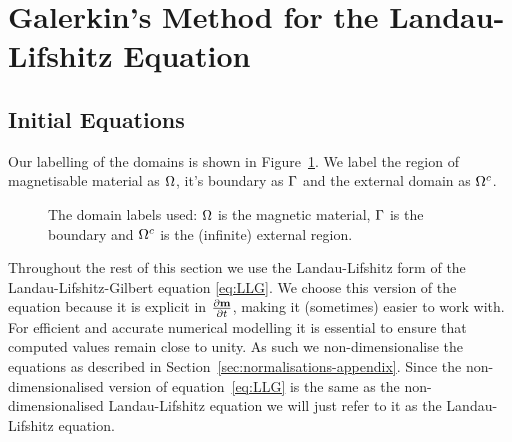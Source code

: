 

\newcommand{\skewop}{\text{\Large{$\Lambda$}}}
\newcommand{\skewm}[1]{\skewop\left[ #1 \right]}
\newcommand{\crossop}[2]{\skewm{ #1 } \cdot \left( #2 \right)}

\newcommand*\circled[1]{\tikz[baseline=(char.base)]{
    \node[shape=circle,draw,inner sep=1pt] (char) {#1};}}
\newcommand{\mxex}{I}
\newcommand{\mxmxex}{J}


\newcommand{\intp}[1]{\sum_\ibasisc \sk #1_\ibasisc}
\newcommand{\intpb}[1]{\left( \intp{#1} \right)}

\newcommand{\ik}{\ibasisc}

\newcommand{\dtsdml}{J_\text{ts}}

\section{Galerkin's Method for the Landau-Lifshitz Equation}
\label{sec:galerk-meth-ll}

\subsection{Initial Equations}

Our labelling of the domains is shown in Figure~\ref{fig:domain_labels}. We label the region of magnetisable material as $\Omega$, it's boundary as ${\Gamma}$ and the external domain as ${\Omega^c}$.

\begin{figure}[!ht]
  \center
  \caption{The domain labels used: $\Omega$ is the magnetic material, ${\Gamma}$ is the boundary and ${\Omega^c}$ is the (infinite) external region.} \label{fig:domain_labels}
\end{figure}

Throughout the rest of this section we use the Landau-Lifshitz form of the Landau-Lifshitz-Gilbert equation \eqref{eq:LLG}.
We choose this version of the equation because it is explicit in $\frac{\partial \mathbf{m}}{\partial t}$, making it (sometimes) easier to work with.
For efficient and accurate numerical modelling it is essential to ensure that computed values remain close to unity.
As such we non-dimensionalise the equations as described in Section~\ref{sec:normalisations-appendix}.
Since the non-dimensionalised version of equation~\eqref{eq:LLG} is the same as the non-dimensionalised Landau-Lifshitz equation we will just refer to it as the Landau-Lifshitz equation.

